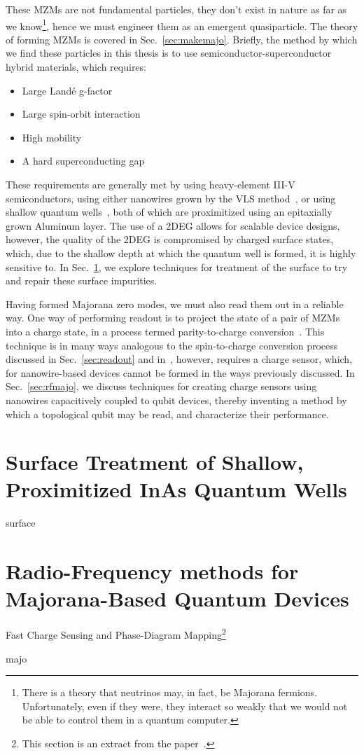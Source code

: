 These MZMs are not fundamental particles, they don't exist in nature as far as we know\footnote{There is a theory that neutrinos may, in
fact, be Majorana fermions. Unfortunately, even if they were, they interact so weakly that we would not be able to control them in a quantum computer.},
hence we must engineer them as an emergent quasiparticle. The theory of forming MZMs is covered in Sec.~\ref{sec:makemajo}. Briefly, the method by
which we find these particles in this thesis is to use semiconductor-superconductor hybrid materials, which requires:
\begin{itemize}
    \item Large Land\'e g-factor
    \item Large spin-orbit interaction
    \item High mobility
    \item A hard superconducting gap
\end{itemize}
These requirements are generally met by using heavy-element III-V semiconductors, using either nanowires grown by the VLS method~\cite{nnano.2014.306,Krogstrup},
or using shallow quantum wells~\cite{PhysRevB.93.155402}, both of which are proximitized using an epitaxially grown Aluminum layer. The use of a 2DEG allows
for scalable device designs, however, the quality of the 2DEG is compromised by charged surface states, which, due to the shallow depth at which the quantum
well is formed, it is highly sensitive to. In Sec.~\ref{sec:inas_hb}, we explore techniques for treatment of the surface to try and repair these surface impurities.

Having formed Majorana zero modes, we must also read them out in a reliable way. One way of performing readout is to project the state of a pair of MZMs into
a charge state, in a process termed parity-to-charge conversion~\cite{AasenPRX16}. This technique is in many ways analogous to the spin-to-charge conversion
process discussed in Sec.~\ref{sec:readout} and in~\cite{petta,RevModPhys.79.1217}, however, requires a charge sensor, which, for nanowire-based devices cannot
be formed in the ways previously discussed. In Sec.~\ref{sec:rfmajo}, we discuss techniques for creating charge sensors using nanowires capacitively coupled
to qubit devices, thereby inventing a method by which a topological qubit may be read, and characterize their performance.

\clearpage
\section{Surface Treatment of Shallow, Proximitized InAs Quantum Wells}
\label{sec:inas_hb}
{surface}

\clearpage
\section{Radio-Frequency methods for {Majorana-Based} {Quantum} {Devices}}
{\large \bf \begin{center}Fast Charge Sensing and Phase-Diagram Mapping\footnote{
    This section is an extract from the paper~\cite{PhysRevApplied.11.064011}.
}\end{center}}
\label{sec:rfmajo}
{majo}

